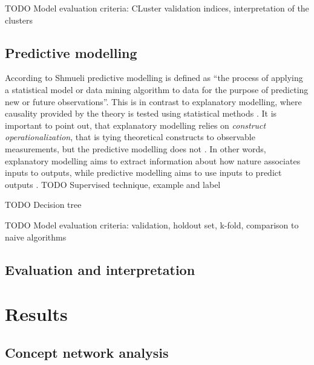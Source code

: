 \documentclass[utf8,english]{gradu3}
\begin{document}
TODO Model evaluation criteria: CLuster validation indices, interpretation of the clusters


\section{Predictive modelling}

According to Shmueli \parencite*{shmueliExplainPredict2010} predictive modelling is defined as \enquote{the process of applying a statistical model or data mining algorithm to data for the purpose of predicting new or future observations}. This is in contrast to explanatory modelling, where causality provided by the theory is tested using statistical methods \parencite{shmueliExplainPredict2010}. It is important to point out, that explanatory modelling relies on \emph{construct operationalization}, that is tying theoretical constructs to observable measurements, but the predictive modelling does not \parencite{shmueliExplainPredict2010}. In other words, explanatory modelling aims to extract information about how nature associates inputs to outputs, while predictive modelling aims to use inputs to predict outputs \parencite{breimanStatisticalModelingTwo2001}.
TODO Supervised technique, example and label

TODO Decision tree

TODO Model evaluation criteria: validation, holdout set, k-fold, comparison to naive algorithms

\section{Evaluation and interpretation}

\chapter{Results}



\section{Concept network analysis}
\end{document}
